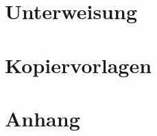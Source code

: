 \documentclass[11pt,a4paper,titlepage,openright,multicol]{scrbook}
\begin{document}




\tableofcontents

\part{Unterweisung}
\label{part:Unterweisung}
%





\part{Kopiervorlagen}
\label{part:Kopiervorlagen}

\appendix
\part{Anhang}
\label{part:Anhang}



\printglossary

\listoffigures

\listoftables


\printindex

\end{document}
